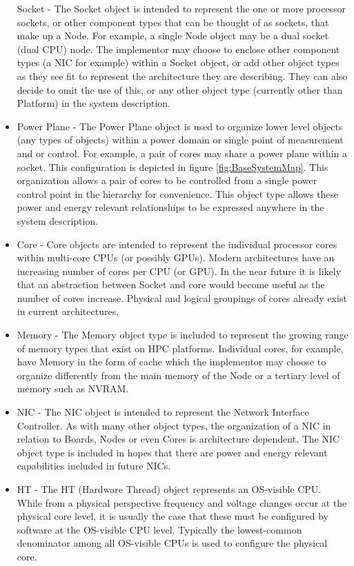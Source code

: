 \documentclass[12pt]{report} %
\begin{document}
\begin{itemize}[noitemsep,nolistsep]
{Socket - The Socket object is intended to represent the one or more processor sockets, or other component types that can be thought of as sockets, that make up a Node. 
For example, a single Node object may be a dual socket (dual CPU) node.
The implementor may choose to enclose other component types (a NIC for example) within a Socket object, or add other object types as they see fit to represent the architecture they are describing.
They can also decide to omit the use of this, or any other object type (currently other than Platform) in the system description.
}
	\item{
Power Plane - The Power Plane object is used to organize lower level objects (any types of objects) within a power domain or single point of measurement and or control.
For example, a pair of cores may share a power plane within a socket. 
This configuration is depicted in figure \ref{fig:BaseSystemMap}. 
This organization allows a pair of cores to be controlled from a single power control point in the hierarchy for convenience. 
This object type allows these power and energy relevant relationships to be expressed anywhere in the system description.
}
	\item{
Core - Core objects are intended to represent the individual processor cores within multi-core CPUs (or possibly GPUs). 
Modern architectures have an increasing number of cores per CPU (or GPU). 
In the near future it is likely that an abstraction between Socket and core would become useful as the number of cores increase. 
Physical and logical groupings of cores already exist in current architectures.
}
	\item{Memory - The Memory object type is included to represent the growing range of memory types that exist on HPC platforms. 
Individual cores, for example, have Memory in the form of cache which the implementor may choose to organize differently from the main memory of the Node or a tertiary level of memory such as NVRAM.
}	
	\item{
NIC - The NIC object is intended to represent the Network Interface Controller.
As with many other object types, the organization of a NIC in relation to Boards, Nodes or even Cores is architecture dependent.
The NIC object type is included in hopes that there are power and energy relevant capabilities included in future NICs.
}	
        \item{
HT - The HT (Hardware Thread) object represents an OS-visible CPU.  
While from a physical perspective frequency and voltage changes occur at the physical core level, it is usually the case that these must be configured by software at the OS-visible CPU level.  
Typically the lowest-common denominator among all OS-visible CPUs is used to configure the physical core.
}

\end{itemize}
\end{document}
